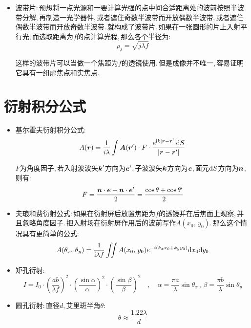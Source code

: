 \begin{itemize}
\item 波带片:\,预想将一点光源和一要计算光强的点中间合适距离处的波前按照半波带分解,\,再制造一光学器件,\,或者遮住奇数半波带而开放偶数半波带,\,或者遮住偶数半波带而开放奇数半波带.\,就构成了波带片.\,如果在一张圆形的片上入射平行光,\,而选取距离为$f$的点计算光程,\,那么各个半径为:
\[\rho_j=\sqrt{j\lambda f}\]

这样的波带片可以当做一个焦距为$f$的透镜使用.\,但是成像并不唯一,\,容易证明它具有一组虚焦点和实焦点.


\end{itemize}


\section{衍射积分公式}

\begin{itemize}
\item 基尔霍夫衍射积分公式:
\[A(\boldsymbol{r})=\frac{1}{i\lambda}\int \boldsymbol{A}(\boldsymbol{r}')\cdot F\cdot \frac{e^{{\rm i} k|\boldsymbol{r}-\boldsymbol{r}'|}\textrm{d} S}{|\boldsymbol{r}-\boldsymbol{r}'|}\]

$F$为角度因子,\,若入射波波矢$\boldsymbol{k}'$方向为$\boldsymbol{e}'$,\,子波波矢$\boldsymbol{k}$方向为$\boldsymbol{e}$,\,面元$\textrm{d} S$方向为$\boldsymbol{n}$,\,则有:
\[F=\frac{\boldsymbol{n}\cdot \boldsymbol{e}+\boldsymbol{n}\cdot \boldsymbol{e}'}{2}=\frac{\cos\theta+\cos \theta'}{2}\]

\item 夫琅和费衍射公式:\,如果在衍射屏后放置焦距为$f$的透镜并在后焦面上观察,\,并且忽略角度因子.\,把入射场在衍射屏作用后的波前写作$A(x_0,\,y_0)$.\,那么这个情况具有更简单的公式:
\[A(\theta_x,\,\theta_y)=\frac{1}{{\rm i}\lambda f}\iint A(x_0,\,y_0)e^{-i(k_x x_0+k_y y_0)}\textrm{d} x_0\textrm{d} y_0\]

\item 矩孔衍射:
\[I=I_0\cdot \left(\frac{ab}{\lambda f}\right)^2\cdot \left(\frac{\sin\alpha}{\alpha}\right)^2\cdot \left(\frac{\sin\beta}{\beta}\right)^2\quad ,\quad \alpha =\frac{\pi a}{\lambda}\sin\theta_x\,,\,\beta =\frac{\pi b}{\lambda}\sin\theta_y\]

\item 圆孔衍射:\,直径$d$,\,艾里斑半角$\theta$:
\[\theta\approx \frac{1.22\lambda 	}{d}\]
\end{itemize}

